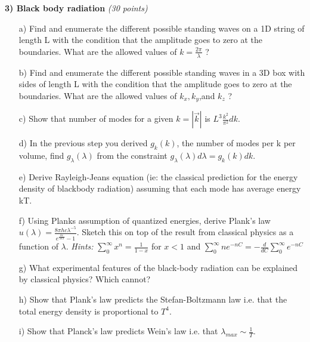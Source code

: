 {\textbf{3) Black body radiation } \hfill \textit{(30 points)}
\begin{itemize}
\item[a)] Find and enumerate the different possible standing waves on a 1D string of length L with the condition that the amplitude goes to zero at the boundaries.
         What are the allowed values of $k=\frac{2\pi}{\lambda}$ ?
\item[b)] Find and enumerate the different possible standing waves in a 3D box with sides of length L with the condition that the amplitude goes to zero at the boundaries.
         What are the allowed values of $k_x,k_y$,and $k_z$ ?
\item[c)] Show that number of modes for a given $k = |\vec{k}|$ is $L^3 \frac{k^2}{\pi^2} dk$.
\item[d)] In the previous step you derived $g_k(k)$, the number of modes per k per volume, find $g_\lambda(\lambda)$ from the constraint $g_\lambda(\lambda)d\lambda = g_k(k)dk$.
\item[e)] Derive Rayleigh-Jeans equation (ie: the classical prediction for the energy density of blackbody radiation) assuming that each mode has average energy kT.
\item[f)] Using Planks assumption of quantized energies, derive Plank's law $u(\lambda) = \frac{8\pi h c \lambda^{-5}}{e^{\frac{hc}{\lambda kT}} - 1}$.
Sketch this on top of the result from classical physics as a function of $\lambda$.
\textit{Hints:} $\sum_0^\infty x^n = \frac{1}{1-x}$ for $x<1$ and $\sum_0^\infty n e^{-nC} = - \frac{d}{dC} \sum_0^\infty e^{-nC}$
\item[g)] What experimental features of the black-body radiation can be explained by classical physics? Which cannot?
\item[h)] Show that Plank's law predicts the Stefan-Boltzmann law i.e. that the total energy density is proportional to $T^4$.
\item[i)] Show that Planck’s law predicts Wein’s law i.e. that $\lambda_{max} \sim \frac{1}{T}$.
\end{itemize}

\vspace*{0.5in}


}
